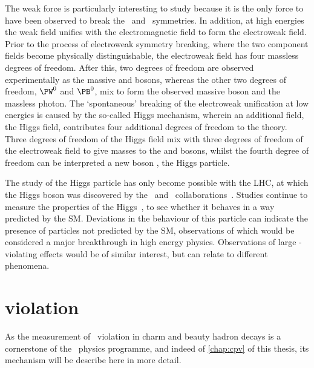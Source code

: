 The weak force is particularly interesting to study because it is the only 
force to have been observed to break the \Ptransform\ and \CP\ symmetries.
In addition, at high energies the weak field unifies with the electromagnetic 
field to form the electroweak field.
Prior to the process of electroweak symmetry breaking, where the two component 
fields become physically distinguishable, the electroweak field has four 
massless degrees of freedom.
After this, two degrees of freedom are observed experimentally as the massive 
\PWp and \PWm bosons, whereas the other two degrees of freedom, $\PW^{0}$ and 
$\PB^{0}$, mix to form the observed massive \PZ boson and the massless photon.
The `spontaneous' breaking of the electroweak unification at low energies is 
caused by the so-called Higgs mechanism, wherein an additional field, the Higgs
field, contributes four additional degrees of freedom to the theory.
Three degrees of freedom of the Higgs field mix with three degrees of freedom 
of the electroweak field to give masses to the \PWpm and \PZ bosons, whilst the 
fourth degree of freedom can be interpreted a new boson \PH, the Higgs 
particle.

The study of the Higgs particle has only become possible with the \ac{LHC}, at 
which the Higgs boson was discovered by the \atlas\ and \cms\ 
collaborations~\cite{Aad:2012tfa,Chatrchyan:2012xdj}.
Studies continue to measure the properties of the 
Higgs~\cite{Khachatryan:2016vau}, to see whether it behaves in a way predicted 
by the \ac{SM}.
Deviations in the behaviour of this particle can indicate the presence of 
particles not predicted by the \ac{SM}, observations of which would be 
considered a major breakthrough in high energy physics.
Observations of large \CP-violating effects would be of similar interest, but 
can relate to different phenomena.

\section{\texorpdfstring{\CP}{CP} violation}
\label{chap:intro:sm:cp}

As the measurement of \CP\ violation in charm and beauty hadron decays is a 
cornerstone of the \lhcb\ physics programme, and indeed of \cref{chap:cpv} of 
this thesis, its mechanism will be describe here in more detail.

